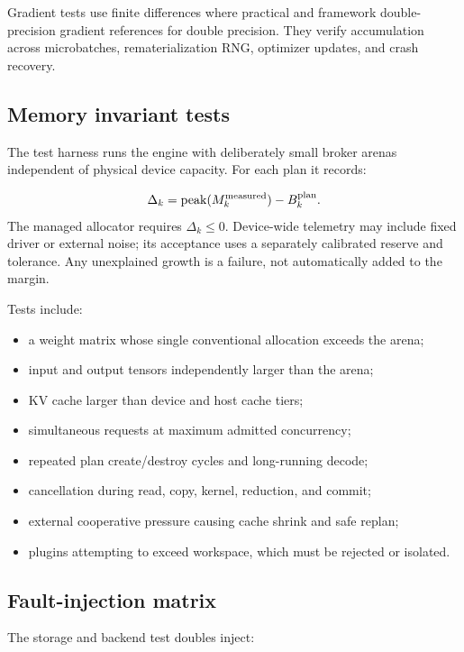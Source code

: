 Gradient tests use finite differences where practical and framework double-precision gradient references for double precision. They verify accumulation across microbatches, rematerialization RNG, optimizer updates, and crash recovery.

\subsection{Memory invariant tests}

The test harness runs the engine with deliberately small broker arenas independent of physical device capacity. For each plan it records:

\[
  \Delta_k=\operatorname{peak}(M_k^{\mathrm{measured}})-B_k^{\mathrm{plan}}.
\]
The managed allocator requires $\Delta_k\le0$. Device-wide telemetry may include fixed driver or external noise; its acceptance uses a separately calibrated reserve and tolerance. Any unexplained growth is a failure, not automatically added to the margin.

Tests include:

\begin{itemize}
  \item a weight matrix whose single conventional allocation exceeds the arena;
  \item input and output tensors independently larger than the arena;
  \item KV cache larger than device and host cache tiers;
  \item simultaneous requests at maximum admitted concurrency;
  \item repeated plan create/destroy cycles and long-running decode;
  \item cancellation during read, copy, kernel, reduction, and commit;
  \item external cooperative pressure causing cache shrink and safe replan;
  \item plugins attempting to exceed workspace, which must be rejected or isolated.
\end{itemize}

\subsection{Fault-injection matrix}

The storage and backend test doubles inject:

